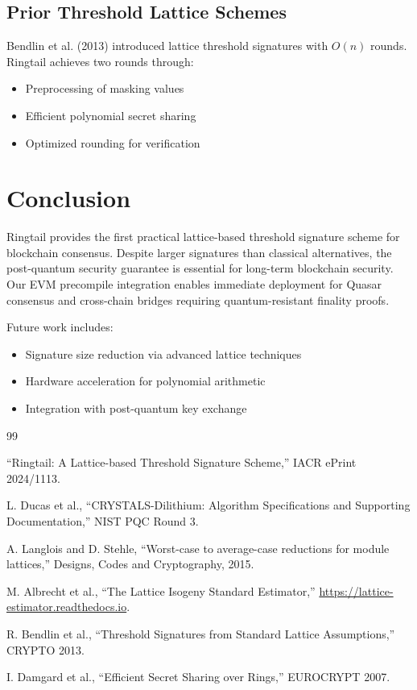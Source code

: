 \documentclass[11pt,a4paper]{article}
\theoremstyle{definition}
\begin{document}
\subsection{Prior Threshold Lattice Schemes}

Bendlin et al. (2013) introduced lattice threshold signatures with $O(n)$ rounds. Ringtail achieves two rounds through:
\begin{itemize}
\item Preprocessing of masking values
\item Efficient polynomial secret sharing
\item Optimized rounding for verification
\end{itemize}

\section{Conclusion}

Ringtail provides the first practical lattice-based threshold signature scheme for blockchain consensus. Despite larger signatures than classical alternatives, the post-quantum security guarantee is essential for long-term blockchain security. Our EVM precompile integration enables immediate deployment for Quasar consensus and cross-chain bridges requiring quantum-resistant finality proofs.

Future work includes:
\begin{itemize}
\item Signature size reduction via advanced lattice techniques
\item Hardware acceleration for polynomial arithmetic
\item Integration with post-quantum key exchange
\end{itemize}


\begin{thebibliography}{99}

``Ringtail: A Lattice-based Threshold Signature Scheme,'' IACR ePrint 2024/1113.

L. Ducas et al., ``CRYSTALS-Dilithium: Algorithm Specifications and Supporting Documentation,'' NIST PQC Round 3.

A. Langlois and D. Stehle, ``Worst-case to average-case reductions for module lattices,'' Designs, Codes and Cryptography, 2015.

M. Albrecht et al., ``The Lattice Isogeny Standard Estimator,'' \url{https://lattice-estimator.readthedocs.io}.

R. Bendlin et al., ``Threshold Signatures from Standard Lattice Assumptions,'' CRYPTO 2013.

I. Damgard et al., ``Efficient Secret Sharing over Rings,'' EUROCRYPT 2007.

\end{thebibliography}
\end{document}
